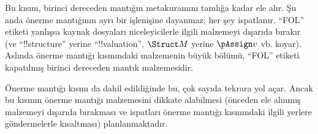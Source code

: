 


\begin{editorial}
  Bu kısım, birinci dereceden mantığın metakuramını tamlığa kadar ele
  alır. Şu anda önerme mantığının ayrı bir işlenişine dayanmaz; her şey
  ispatlanır. ``FOL'' etiketi yanlışsa kaynak dosyaları niceleyicilerle
  ilgili malzemeyi dışarıda bırakır (ve ``!!{structure}'' yerine
  ``!!{valuation}'', $\Struct M$ yerine $\pAssign v$ vb. koyar).
  Aslında önerme mantığı kısmındaki malzemenin büyük bölümü, ``FOL''
  etiketi kapatılmış birinci dereceden mantık malzemesidir.

  Önerme mantığı kısmı da dahil edildiğinde bu, çok sayıda tekrara yol
  açar. Ancak bu kısmın önerme mantığı malzemesini dikkate alabilmesi
  (önceden ele alınmış malzemeyi dışarıda bırakması ve ispatları önerme
  mantığı kısmındaki ilgili yerlere göndermelerle kısaltması)
  planlanmaktadır.
\end{editorial}












\OLEndPartHook

